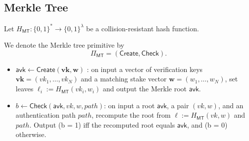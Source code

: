 \documentclass{article}
\begin{document}
\subsection{Merkle Tree}






Let $H_{\mathsf{MT}}  : \{0,1\}^* \to \{0,1\}^\lambda$ be a collision-resistant hash function.

We denote the Merkle tree primitive by
\[
\Pi_{\mathsf{MT}} = (\mathsf{Create}, \mathsf{Check}).
\]

\begin{itemize}

    \item $\mathsf{avk} \leftarrow \mathsf{Create}(\mathbf{vk}, \mathbf{w})$ : 
    on input a vector of verification keys $\mathbf{vk} = (vk_1,\dots,vk_N)$ and a matching stake vector $\mathbf{w}=(w_1,\dots,w_N)$, set leaves $\ell_i := H_{\mathsf{MT}} (vk_i , w_i)$ and output the Merkle root $\mathsf{avk}$.
    
    \item $b \leftarrow \mathsf{Check}(\mathsf{avk}, vk, w, path)$: on input a root $\mathsf{avk}$, a pair $(vk,w)$, and an authentication path $path$, recompute the root from $\ell := H_{\mathsf{MT}} (vk , w)$ and $path$. Output (b = 1) iff the recomputed root equals $\mathsf{avk}$, and (b = 0) otherwise.

\end{itemize}
\end{document}
